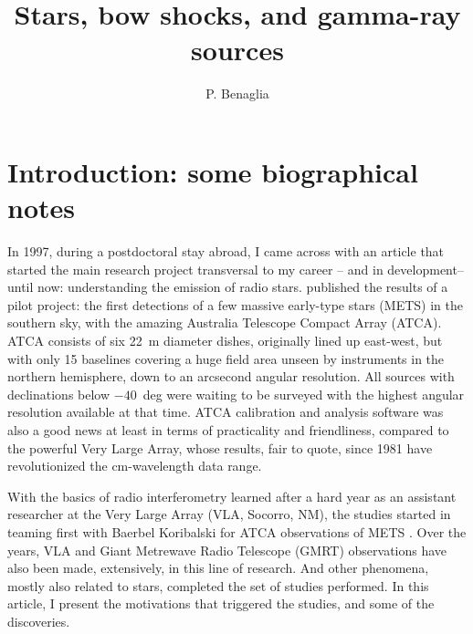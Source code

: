 \documentclass[baaa]{baaa}
\title{Stars, bow shocks, and gamma-ray sources}
\author{
P. Benaglia\inst{1}
}
\institute{  
Instituto Argentino de Radioastronom\'ia, CONICET--CICPBA--UNLP, Argentina
}
\begin{document}
\maketitle
\section{Introduction: some biographical notes}\label{intro}

In 1997, during a postdoctoral stay abroad, I came across with an article that started the main research project { transversal} to my career -- and in development-- until now: understanding the emission of radio stars. \citet{leitherer1995} published the results of a pilot project: the first detections of a few massive early-type stars (METS) in the southern sky,  
with the amazing Australia Telescope Compact Array (ATCA). ATCA consists of six 22~m diameter dishes, originally lined up east-west, but  with only 15 baselines covering a huge field area unseen by instruments in the northern hemisphere, down to an arcsecond angular resolution. All sources with declinations below $-40$~deg were waiting to be surveyed with the highest angular resolution available at that time. ATCA calibration and analysis software was also a good news at least in terms of practicality and friendliness, compared to the powerful Very Large Array, whose results, fair to quote, since 1981 have revolutionized the cm-wavelength data range. 

With the basics of radio interferometry learned after a hard year as an assistant researcher at the Very Large Array (VLA, Socorro, NM), the studies started in teaming first with Baerbel Koribalski for ATCA observations of METS \citep{benagliamdot200}. Over the years,  VLA and Giant Metrewave Radio Telescope (GMRT) observations have also been made, extensively, in this line of research. And other phenomena, mostly also related to stars, completed the set of studies performed.
In this article, I present the motivations that triggered the studies, and some of the discoveries.
 
\end{document}
